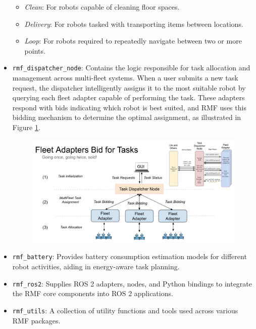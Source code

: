 \begin{itemize}
	\begin{itemize}
		\item \textit{Clean}: For robots capable of cleaning floor spaces.
		\item \textit{Delivery}: For robots tasked with transporting items between locations.
		\item \textit{Loop}: For robots required to repeatedly navigate between two or more points.
	\end{itemize}
	\item \texttt{rmf\_dispatcher\_node}: Contains the logic responsible for task allocation and management across multi-fleet systems. When a user submits a new task request, the dispatcher intelligently assigns it to the most suitable robot by querying each fleet adapter capable of performing the task. These adapters respond with bids indicating which robot is best suited, and RMF uses this bidding mechanism to determine the optimal assignment, as illustrated in Figure \ref{fig:Open-RMF Bid Task}.
	\begin{figure}[h]
		\centering
		\includegraphics[width=0.8\linewidth]{img/RMF_tut_BidTask.png}
		\label{fig:Open-RMF Bid Task}
	\end{figure}
	\item \texttt{rmf\_battery}: Provides battery consumption estimation models for different robot activities, aiding in energy-aware task planning.
	\item \texttt{rmf\_ros2}: Supplies ROS 2 adapters, nodes, and Python bindings to integrate the RMF core components into ROS 2 applications.
	\item \texttt{rmf\_utils}: A collection of utility functions and tools used across various RMF packages.
	
\end{itemize}

